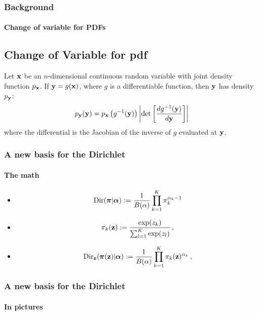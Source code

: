 \documentclass[10pt,usepdftitle=false,aspectratio=169,handout]{beamer}
\begin{document}

\begin{frame}\frametitle{Background}
    \framesubtitle{Change of variable for PDFs}
	\subsection*{Change of Variable for pdf} 
	Let ${\mathbf{x}}$ be an $n$-dimensional continuous random variable with joint density function $p_{\mathbf{x}}$. If ${\mathbf{y}} = g({\mathbf{x}})$, where $g$ is a differentiable function, then ${\mathbf{y}}$ has density $p_{\mathbf{y}}$:
	\begin{equation}
	p_{\mathbf{y}}(\mathbf{y}) = p_{\mathbf{x}}\left(g^{-1}(\mathbf{{\mathbf{y}}})\right)\left\vert \operatorname{det}\left[\frac{dg^{-1}(\mathbf{{\mathbf{y}}})}{d\mathbf{{\mathbf{y}}}} \right]\right \vert
	\end{equation}
	where the differential is the Jacobian of the inverse of $g$ evaluated at ${\mathbf{y}}$. 
\end{frame}


\begin{frame}\frametitle{A new basis for the Dirichlet}
	\framesubtitle{The math}
	\begin{itemize}
		\item \begin{equation}\label{eq:dirichlet}
		\mathrm{Dir}(\boldsymbol{\pi} | {\boldsymbol{\alpha}}) := \frac{1}{B(\alpha)}\prod_{k=1}^K \pi_k^{\alpha_k-1}
		\end{equation}
		\item \begin{equation}
		\pi_k(\mathbf{z}) := \frac{\exp(z_k)}{\sum_{l=1}^K \exp(z_l)} \, ,
		\end{equation}
		\item \begin{equation}\label{eq:dirichlet_softmax}
		\mathrm{Dir}_{\mathbf{z}}(\boldsymbol{\pi}(\mathbf{z}) | {\boldsymbol{\alpha}}) := \frac{1}{B(\alpha)}\prod_{k=1}^K \pi_k(\mathbf{z})^{\alpha_k} \, ,
		\end{equation}
	\end{itemize}
\end{frame}


\setlength{\figwidth}{0.33\textwidth}
\setlength{\figheight}{0.7\textheight}

\begin{frame}\frametitle{A new basis for the Dirichlet}
	\framesubtitle{In pictures}
	\begin{figure}
		\centering
		\scriptsize
		
	\end{figure}
\end{frame}
\end{document}
